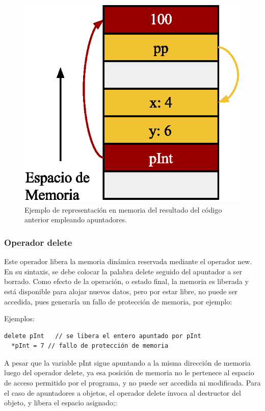 \begin{figure}[!htb]
\centering
\includegraphics[scale=.7]{images/pointers.eps}
\caption{Ejemplo de representación en memoria del resultado del código anterior empleando apuntadores.}
\label{fig:pointer}
\end{figure}

\subsubsection{Operador delete}

Este operador libera la memoria dinámica reservada mediante el operador new. En su sintaxis, se debe colocar la palabra delete seguido del apuntador a ser borrado. Como efecto de la operación, o estado final, la memoria es liberada y está disponible para alojar nuevos datos, pero por estar libre, no puede ser accedida, pues generaría un fallo de protección de memoria, por ejemplo:

Ejemplos:
\begin{lstlisting}[upquote=true, language=pseudo]
  delete pInt	// se libera el entero apuntado por pInt
  *pInt = 7	// fallo de protección de memoria
\end{lstlisting}

A pesar que la variable pInt sigue apuntando a la misma dirección de memoria luego del operador delete, ya esa posición de memoria no le pertenece al espacio de acceso permitido por el programa, y no puede ser accedida ni modificada. Para el caso de apuntadores a objetos, el operador delete invoca al destructor del objeto, y libera el espacio asignado;:

